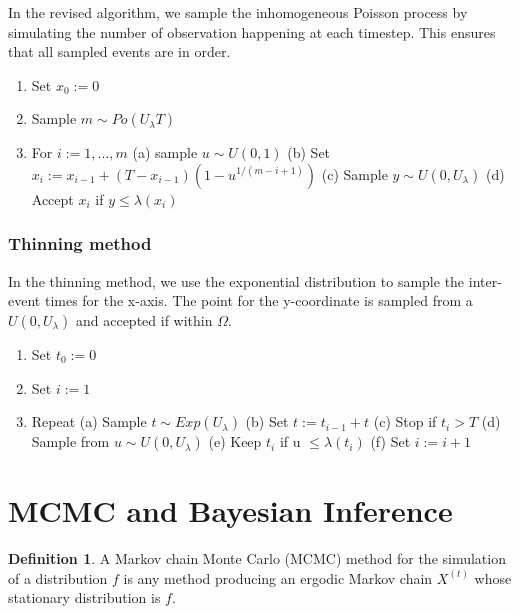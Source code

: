 \documentclass[letterpaper, 12pt]{article}
\newcommand{\myexample}[2]{
    \begin{tcolorbox}[colback=black!5!white,colframe=black,title={Example: #1},
    before skip=12pt]
        #2
    \end{tcolorbox}
}
\newcommand{\1}{\mathds{1}} %
\theoremstyle{definition}
\newtheorem{definition}[theorem]{Definition}
\begin{document}
In the revised algorithm, we sample the inhomogeneous Poisson process by simulating the number of observation happening at each timestep. This ensures that all sampled events are in order.

\myexample{The "revised" algorithm}{
\begin{enumerate}[itemsep=-1pt]
  \item Set $x_0 := 0$
  \item Sample $m \sim Po(U_\lambda T)$
  \item For $i := 1, ..., m$
        \subitem (a) sample $u \sim U(0, 1)$
        \subitem (b) Set $x_i := x_{i-1} + (T - x_{i-1})(1-u^{1/(m-i+1)})$
        \subitem (c) Sample $y \sim U(0, U_\lambda)$
        \subitem (d) Accept $x_i$ if $y \leq \lambda(x_i)$
\end{enumerate}
}

\subsubsection{Thinning method}

In the thinning method, we use the exponential distribution to sample the inter-event times for the x-axis. The point for the y-coordinate is sampled from a $U(0, U_\lambda)$ and accepted if within $\Omega$.

\myexample{Thinning method}{
\begin{enumerate}[itemsep=-1pt]
  \item Set $t_0 := 0$
  \item Set $i := 1$
  \item Repeat
        \subitem (a) Sample $t \sim Exp(U_\lambda)$
        \subitem (b) Set $t := t_{i-1} + t$
        \subitem (c) Stop if $t_i > T$
        \subitem (d) Sample from $u \sim U(0,U_\lambda)$
        \subitem (e) Keep $t_i$ if u $\leq \lambda(t_i)$
        \subitem (f) Set $i := i+1$
\end{enumerate}
}

\section{MCMC and Bayesian Inference}

\begin{definition}
  A Markov chain Monte Carlo (MCMC) method for the simulation of a distribution $f$ is any method producing an ergodic Markov chain $X^{(t)}$ whose stationary distribution is $f$.
\end{definition}
\end{document}
